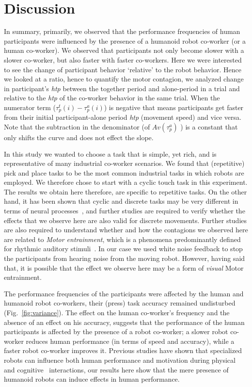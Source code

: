\documentclass[a4paper, 12pt, oneside]{Thesis}  %
\begin{document}

\clearpage
\section{Discussion}
In summary, primarily, we observed that the performance frequencies of human participants were influenced by the presence of a humanoid robot co-worker (or a human co-worker). We observed that participants not only become slower with a slower co-worker, but also faster with faster co-workers. Here we were interested to see the change of participant behavior `relative' to the robot behavior. Hence we looked at a ratio, hence to quantify the motor contagion, we analyzed change in participant's \textit{htp} between the together period and alone-period in a trial and relative to the {\it htp} of the co-worker behavior in the same trial. When the numerator term ($\tau_p^t(i)-\tau_p^a(i)$) is negative that means participants get faster from their initial participant-alone period \textit{htp} (movement speed) and vice versa. Note that the subtraction in the denominator (of $Av(\tau_p^a)$ ) is a constant that only shifts the curve and does not effect the slope.  

In this study we wanted to choose a task that is simple, yet rich, and is representative of many industrial co-worker scenarios. We found that (repetitive) pick and place tasks to be the most common industrial tasks in which robots are employed. We therefore chose to start with a cyclic touch task in this experiment. The results we obtain here therefore, are specific to repetitive tasks. On the other hand, it has been shown that cyclic and discrete tasks may be very different in terms of neural processes~\cite{Schaal:Nature:2004}, and further studies are required to verify whether the effects that we observe here are also valid for discrete movements. Further studies are also required to understand whether and how the contagions we observed here are related to \textit{Motor entrainment}, which is a phenomena predominantly defined for rhythmic auditory stimuli~\cite{Tierney:Frontiers:2014,Schachner:Elsevier:2009}. In our case we used white noise feedback to stop the participants from hearing noise from the moving robot. However, having said that, it is possible that the effect we observe here may be a form of \textit{visual} Motor entrainment. 

The performance frequencies of the participants were affected by the human and humanoid robot co-workers, their (press) task accuracy remained undisturbed (Fig.~\ref{fig:variance}). The effect on the human co-worker's frequency and the absence of an effect on his accuracy, suggests that the performance of the human participants is affected by the presence of a robot co-worker; a slower robot co-worker reduces human performance (in terms of speed and accuracy), while a faster robot co-worker improves it. Previous studies have shown that specialized robots can influence both human performance and motivation during physical~\cite{Takagi:Nature:2017} and cognitive~\cite{Fasola:ICDL:2010} interactions, our results here show that the mere presence of humanoid robots can induce effects in human performance. 
\end{document}

